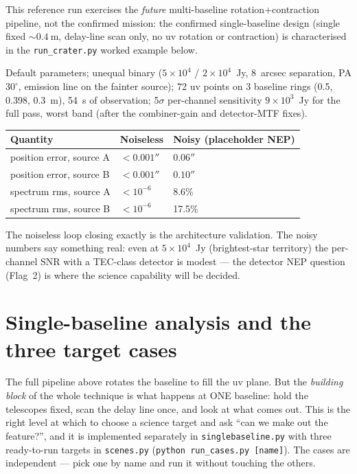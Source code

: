 \documentclass[11pt]{article}
\newcommand{\code}[1]{\texttt{\small #1}}
\newcommand{\file}[1]{\textcolor{plumdark}{\texttt{\small #1}}}
\begin{document}
This reference run exercises the \emph{future} multi-baseline
rotation+contraction pipeline, not the confirmed mission: the confirmed
single-baseline design (single fixed ${\sim}\SI{0.4}{\metre}$, delay-line
scan only, no uv rotation or contraction) is characterised in the
\file{run\_crater.py} worked example below.

Default parameters; unequal binary ($5\times10^4$ / $2\times10^4$~Jy,
8~arcsec separation, PA $30^\circ$, emission line on the fainter source);
72 uv points on 3 baseline rings (0.5, 0.398, \SI{0.3}{\metre}),
\SI{54}{\second} of observation; 5$\sigma$ per-channel sensitivity
$9\times10^3$~Jy for the full pass, worst band (after the combiner-gain and detector-MTF fixes).

\begin{center}\small
\begin{tabular}{@{}lll@{}}
\toprule
\textbf{Quantity} & \textbf{Noiseless} & \textbf{Noisy (placeholder NEP)}\\
\midrule
position error, source A & $<0.001''$ & $0.06''$\\
position error, source B & $<0.001''$ & $0.10''$\\
spectrum rms, source A & $<10^{-6}$ & 8.6\%\\
spectrum rms, source B & $<10^{-6}$ & 17.5\%\\
\bottomrule
\end{tabular}
\end{center}

The noiseless loop closing exactly is the architecture validation. The noisy
numbers say something real: even at $5\times10^4$~Jy (brightest-star
territory) the per-channel SNR with a TEC-class detector is modest --- the
detector NEP question (Flag~2) is where the science capability will be
decided.

\section{Single-baseline analysis and the three target cases}

The full pipeline above rotates the baseline to fill the uv plane. But the
\emph{building block} of the whole technique is what happens at ONE baseline:
hold the telescopes fixed, scan the delay line once, and look at what comes
out. This is the right level at which to choose a science target and ask
``can we make out the feature?'', and it is implemented separately in
\file{singlebaseline.py} with three ready-to-run targets in \file{scenes.py}
(\code{python run\_cases.py [name]}). The cases are independent --- pick one
by name and run it without touching the others.
\end{document}
